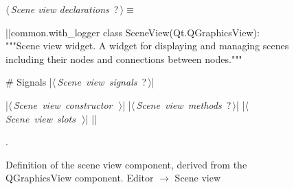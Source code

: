 \documentclass[%
    a4paper,    %
    justified,  %
    nobib,      %
    openany     %
]{tufte-book}
\begin{document}
\begin{figure}
\begin{flushleft} \small
\begin{minipage}{\linewidth}\label{scrap81}\raggedright\small
{} $\langle\,${\itshape Scene view declarations}\nobreak\ {\footnotesize {?}}$\,\rangle\equiv$
\vspace{-1ex}
\begin{pythoncode}
|\normalfont{}\fontfamily{}|common.with_logger
class SceneView(Qt.QGraphicsView):
    """Scene view widget.
    A widget for displaying and managing scenes including their nodes and
    connections between nodes."""

    # Signals
    |\hbox{$\langle\,${\itshape Scene view signals}\nobreak\ {\footnotesize ?}$\,\rangle$}|

    |\hbox{$\langle\,${\itshape Scene view constructor}\nobreak\ {\footnotesize {}}$\,\rangle$}|
    |\hbox{$\langle\,${\itshape Scene view methods}\nobreak\ {\footnotesize ?}$\,\rangle$}|
    |\hbox{$\langle\,${\itshape Scene view slots}\nobreak\ {\footnotesize {}}$\,\rangle$}|
|\NWsep|
\end{pythoncode}
\vspace{1.5ex}
\footnotesize
\begin{list}{}{\setlength{\itemsep}{-\parsep}\setlength{\itemindent}{-\leftmargin}}
\item {\NWtxtMacroNoRef}.

\item{}
\end{list}
\end{minipage}\vspace{4ex}
\end{flushleft}
\caption{Definition of the scene view component, derived from the QGraphicsView
  component.
  \newline{}\newline{}Editor $\rightarrow$ Scene view}
\label{editor:lst:scene-view}
\end{figure}
\end{document}
